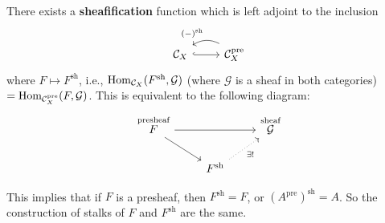         \begin{theorem}
            There exists a \textbf{sheafification} function which is left adjoint to the inclusion
\[
\begin{tikzcd}
\mathcal C_X \arrow[r, hook] & \mathcal C_X ^{\mathrm{pre}} \arrow[l, "(-)^{\mathrm{sh}}"', bend right, shift right]
\end{tikzcd}
\] 
            where $F \mapsto F ^{\mathrm{sh}}$, i.e., $\operatorname{Hom} _{\mathcal{C} _X}(F ^{\mathrm{sh}},\mathcal{G} )$ (where $\mathcal{G} $ is a sheaf in both categories) $=\operatorname{Hom} _{\mathcal{C} _X^{\mathrm{pre}}}(F,\mathcal{G} )$. This is equivalent to the following diagram:\[
            \begin{tikzcd}
\overset{\text{presheaf}}{F} \arrow[rr] \arrow[rd] &                                                  & \overset{\text{sheaf}}{\mathcal G} \\
                                                   & F^{\mathrm{sh}} \arrow[ru, "\exists !"', dotted] &                                   
\end{tikzcd}
            \] 
        \end{theorem}
This implies that if $F$ is a presheaf, then $F ^{\mathrm{sh}}=F$, or $\left( A^{\mathrm{pre}} \right) ^{\mathrm{sh}}=A$. So the construction of stalks of $F$ and $F^{\mathrm{sh}}$ are the same.


